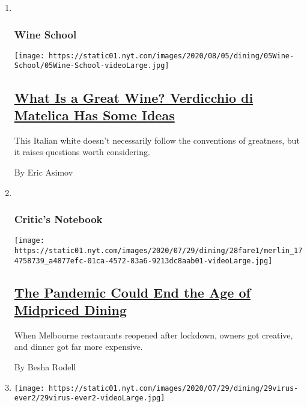 \begin{enumerate}
\def\labelenumi{\arabic{enumi}.}
\item ~
  \hypertarget{wine-school}{%
  \subsubsection{Wine School}\label{wine-school}}

  \texttt{[image: https://static01.nyt.com/images/2020/08/05/dining/05Wine-School/05Wine-School-videoLarge.jpg]}

  \hypertarget{what-is-a-great-wine-verdicchio-di-matelica-has-some-ideas}{%
  \subsection{\texorpdfstring{\href{/2020/07/30/dining/drinks/wine-school-verdicchio-di-matelica.html}{What
  Is a Great Wine? Verdicchio di Matelica Has Some
  Ideas}}{What Is a Great Wine? Verdicchio di Matelica Has Some Ideas}}\label{what-is-a-great-wine-verdicchio-di-matelica-has-some-ideas}}

  This Italian white doesn't necessarily follow the conventions of
  greatness, but it raises questions worth considering.

  By Eric Asimov
\item ~
  \hypertarget{critics-notebook-1}{%
  \subsubsection{Critic's Notebook}\label{critics-notebook-1}}

  \texttt{[image: https://static01.nyt.com/images/2020/07/29/dining/28fare1/merlin\_174758739\_a4877efc-01ca-4572-83a6-9213dc8aab01-videoLarge.jpg]}

  \hypertarget{the-pandemic-could-end-the-age-of-midpriced-dining}{%
  \subsection{\texorpdfstring{\href{/2020/07/28/dining/melbourne-restaurants-coronavirus.html}{The
  Pandemic Could End the Age of Midpriced
  Dining}}{The Pandemic Could End the Age of Midpriced Dining}}\label{the-pandemic-could-end-the-age-of-midpriced-dining}}

  When Melbourne restaurants reopened after lockdown, owners got
  creative, and dinner got far more expensive.

  By Besha Rodell
\item
  \texttt{[image: https://static01.nyt.com/images/2020/07/29/dining/29virus-ever2/29virus-ever2-videoLarge.jpg]}


\end{enumerate}
